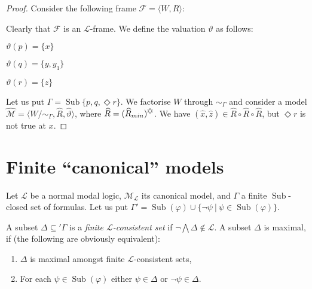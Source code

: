 \documentclass[a4paper]{article}
\theoremstyle{defin}
\theoremstyle{theorem}
\theoremstyle{prop}
\theoremstyle{lemma}
\theoremstyle{fact}
\theoremstyle{ex}
\theoremstyle{col}
\theoremstyle{claim}
\begin{document}
\begin{proof}
  Consider the following frame $\mathcal{F} = \langle W, R \rangle$:

\vspace{\baselineskip}


\vspace{\baselineskip}

  Clearly that $\mathcal{F}$ is an $\mathcal{L}$-frame. We define the valuation $\vartheta$ as follows:

  \begin{center}
    $\vartheta(p) = \{ x \}$

    $\vartheta(q) = \{ y, y_1 \}$

    $\vartheta(r) = \{ z \}$
  \end{center}
  Let us put $\Gamma = \operatorname{Sub} \{ p, q, \Diamond r \}$. We factorise $W$ through $\sim_{\Gamma}$ and consider a model $\widehat{\mathcal{M}} = \langle W / \sim_{\Gamma}, \widehat{R}, \widehat{\vartheta} \rangle$, where $\widehat{R} = (\widehat{R}_{min})^{\davidsstar}$.
  We have $(\hat{x}, \hat{z}) \in \widehat{R} \circ \widehat{R} \circ \widehat{R}$, but $\Diamond r$ is not true at $x$.
\end{proof}

\section{Finite ``canonical'' models}

Let $\mathcal{L}$ be a normal modal logic, $\mathcal{M}_{\mathcal{L}}$ its canonical model, and $\Gamma$ a finite $\operatorname{Sub}$-closed set of formulas. Let us put $\Gamma' = \operatorname{Sub}(\varphi) \cup \{ \neg \psi \: | \: \psi \in \operatorname{Sub}(\varphi) \}$.

A subset $\Delta \subseteq '\Gamma$ is a \emph{finite $\mathcal{L}$-consistent set} if $\neg \bigwedge \Delta \notin \mathcal{L}$. A subset $\Delta$ is maximal, if (the following are obviously equivalent):
\begin{enumerate}
  \item $\Delta$ is maximal amongst finite $\mathcal{L}$-consistent sets,
  \item For each $\psi \in \operatorname{Sub}(\varphi)$ either $\psi \in \Delta$ or
  $\neg \psi \in \Delta$.
\end{enumerate}
\end{document}
